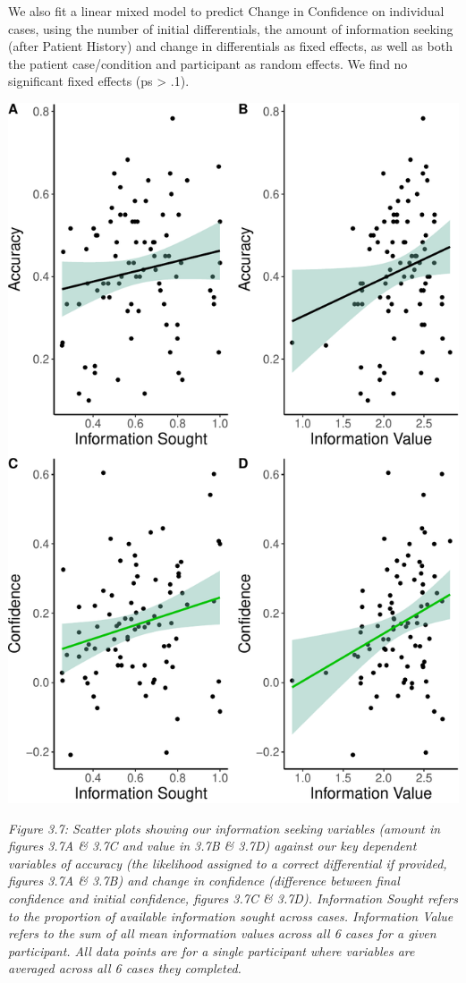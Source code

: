 \documentclass[a4paper, nobind]{templates/ociamthesis}
\begin{document}
\hfill\break
We also fit a linear mixed model to predict Change in Confidence on individual cases, using the number of initial differentials, the amount of information seeking (after Patient History) and change in differentials as fixed effects, as well as both the patient case/condition and participant as random effects. We find no significant fixed effects (ps \textgreater{} .1).

\newpage

\begin{center}\includegraphics[width=1\linewidth]{_main_files/figure-latex/confAccPlot-1} \end{center}

\emph{Figure 3.7: Scatter plots showing our information seeking variables (amount in figures 3.7A \& 3.7C and value in 3.7B \& 3.7D) against our key dependent variables of accuracy (the likelihood assigned to a correct differential if provided, figures 3.7A \& 3.7B) and change in confidence (difference between final confidence and initial confidence, figures 3.7C \& 3.7D). Information Sought refers to the proportion of available information sought across cases. Information Value refers to the sum of all mean information values across all 6 cases for a given participant. All data points are for a single participant where variables are averaged across all 6 cases they completed.}\\
\end{document}
